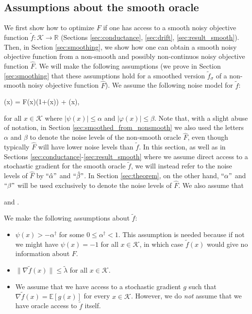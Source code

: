 \documentclass[final,12pt]{colt2018} %
\def \be{\begin{equs}}
\def \ee{\end{equs}}
\begin{document}
{\subsection{Assumptions about the smooth oracle} \label{sec:smooth_assumptions}
We first show how to optimize $F$ if one has access to a smooth noisy objective function $\tilde{f}:\mathcal{K} \rightarrow \mathbb{R}$ (Sections \ref{sec:conductance}, \ref{sec:drift}, \ref{sec:result_smooth}).  Then, in Section \ref{sec:smoothing}, we show how one can obtain a smooth noisy objective function from a non-smooth and possibly non-continuos noisy objective function $\hat{F}$.
%
We will make the following assumptions  (we prove in Section \ref{sec:smoothing} that these assumptions hold for a smoothed version $\tilde{f}_\sigma$ of a non-smooth noisy objective function $\hat{F}$).
%
We assume the following noise model for $\tilde{f}$:
\be
{}(x) = F(x)(1+\psi(x)) + \varphi(x),
\ee
for all $x \in \mathcal{K}$ where $|\psi(x)| \leq \alpha$ and $|\varphi(x)| \leq \beta$.  Note that, with a slight abuse of notation, in Section \ref{sec:smoothed_from_nonsmooth} we also used the letters $\alpha$ and $\beta$ to denote the noise levels of the non-smooth oracle $\hat{F}$, even though typically $\hat{F}$ will have lower noise levels than $\tilde{f}$.  In this section, as well as in Sections \ref{sec:conductance}-\ref{sec:result_smooth} where we assume direct access to a stochastic gradient for the smooth oracle $\tilde{f}$, we will instead refer to the noise levels of $\hat{F}$ by $``\hat{\alpha}"$ and $``\hat{\beta}"$. In Section \ref{sec:theorem}, on the other hand, $``\alpha"$ and $``\beta"$ will be used exclusively to denote the noise levels of $\hat{F}$.  We also assume that
\be \label{eq:assumption_noise}
\alpha \geq \hat{\alpha} \quad \textrm{and} \quad \beta \geq \hat{\beta}.
\ee


%
We make the following assumptions about $\tilde{f}$:
\begin{itemize}
\item $\psi(x)>-\alpha^{\dagger}$ for some $0\leq \alpha^{\dagger}<1$.  This assumption is needed because if not we might have $\psi(x) = -1$ for all $x\in \mathcal{K}$, in which case $\tilde{f}(x)$ would give no information about $F$.
\item $\|\nabla \tilde{f}(x) \| \leq \tilde{\lambda}$  for all $x \in  \mathcal{K}$.
%
\item We assume that we have access to a stochastic gradient $g$ such that $\nabla \tilde{f}(x) = \mathbb{E}[g(x)]$ for every $x \in \mathcal{K}$.  However, we do \emph{not} assume that we have oracle access to $\tilde{f}$ itself.
%
\end{itemize}









}
\end{document}
